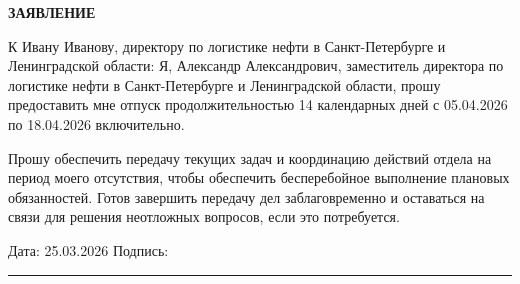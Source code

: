 \documentclass[12pt]{article}
\begin{document}
\begin{center}
\textbf{\LARGE ЗАЯВЛЕНИЕ}
\end{center}

\vspace{1cm}




К Ивану Иванову, директору по логистике нефти в Санкт-Петербурге и Ленинградской области: Я, Александр Александрович, заместитель директора по логистике нефти в Санкт-Петербурге и Ленинградской области, прошу предоставить мне отпуск продолжительностью 14 календарных дней с 05.04.2026 по 18.04.2026 включительно.

Прошу обеспечить передачу текущих задач и координацию действий отдела на период моего отсутствия, чтобы обеспечить бесперебойное выполнение плановых обязанностей. Готов завершить передачу дел заблаговременно и оставаться на связи для решения неотложных вопросов, если это потребуется.

\vfill

\noindent
Дата: 25.03.2026 \hfill Подпись: \rule{5cm}{0.4pt}
\end{document}
